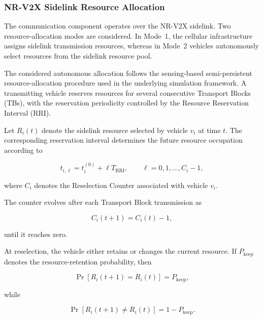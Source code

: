 \subsubsection{NR-V2X Sidelink Resource Allocation}

The communication component operates over the NR-V2X sidelink. Two
resource-allocation modes are considered. In Mode~1, the cellular
infrastructure assigns sidelink transmission resources, whereas in Mode~2
vehicles autonomously select resources from the sidelink resource pool.

The considered autonomous allocation follows the sensing-based
semi-persistent resource-allocation procedure used in the underlying
simulation framework. A transmitting vehicle reserves resources for several
consecutive Transport Blocks (TBs), with the reservation periodicity
controlled by the Resource Reservation Interval (RRI).

Let $R_i(t)$ denote the sidelink resource selected by vehicle $v_i$ at
time $t$. The corresponding reservation interval determines the future
resource occupation according to

\begin{equation}
t_{i,\ell}
=
t_i^{(0)}
+
\ell T_{\mathrm{RRI}},
\qquad
\ell
=
0,1,\ldots,C_i-1,
\label{eq:isac_rri_reservation}
\end{equation}

where $C_i$ denotes the Reselection Counter associated with vehicle $v_i$.

The counter evolves after each Transport Block transmission as

\begin{equation}
C_i(t+1)
=
C_i(t)-1,
\label{eq:isac_rc_update}
\end{equation}

until it reaches zero.

At reselection, the vehicle either retains or changes the current resource.
If $P_{\mathrm{keep}}$ denotes the resource-retention probability, then

\begin{equation}
\Pr
\left[
R_i(t+1)=R_i(t)
\right]
=
P_{\mathrm{keep}},
\label{eq:isac_keep_probability}
\end{equation}

while

\begin{equation}
\Pr
\left[
R_i(t+1)\neq R_i(t)
\right]
=
1-P_{\mathrm{keep}}.
\label{eq:isac_reselection_probability}
\end{equation}

